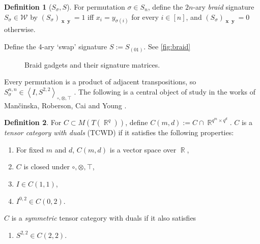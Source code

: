 \documentclass{article}
\theoremstyle{remark}
\theoremstyle{definition}
\newtheorem{definition}{Definition}[section]
\DeclareMathOperator{\rr}{\mathbb{R}}
\DeclareMathOperator{\vx}{\mathbf{x}}
\DeclareMathOperator{\vy}{\mathbf{y}}
\newcommand{\tcwdn}[1]{\left\langle #1 \right\rangle_{\circ, \otimes ,\top}}
\begin{document}
\begin{definition}[$S_\sigma, S$]
    For permutation $\sigma \in S_n$, define the $2n$-ary \emph{braid} signature $S_\sigma \in \mathcal{W}$ 
    by $(S_\sigma)_{\vx\vy} = 1$ iff $x_i = y_{\sigma(i)}$ for every $i \in [n]$, and 
    $(S_\sigma)_{\vx\vy} = 0$ otherwise.

    Define the 4-ary `swap' signature $S := S_{(01)}$. See \autoref{fig:braid}
\end{definition}
\begin{figure}[ht!]
    \centering
     \caption{Braid gadgets and their signature matrices.}
    \label{fig:braid}
\end{figure}
Every permutation is a product of adjacent transpositions, so
$S_\sigma^{n,n} \in \tcwdn{I,S^{2,2}}$ \cite[Lemma 3]{young2022equality}.
The following is a central object of study in the works of
Man\v{c}inska, Roberson, Cai and Young \cite{planar, cai_planar_2023, young2022equality}. 
\begin{definition}
\label{def:tcwd}
For $C \subset M(T(\rr^q))$, define $C(m,d) := C \cap \rr^{q^m\times q^d}$.
$C$ is a \emph{tensor category with duals} (TCWD) if it satisfies the following properties:
\begin{enumerate}[label=(\roman*)]
    \item For fixed $m$ and $d$, $C(m,d)$ is a vector space over $\rr$,
    \item $C$ is closed under $\circ, \otimes, \top$,
    \item $I \in C(1,1)$,
    \item $I^{0,2} \in C(0,2)$.
\end{enumerate}
$C$ is a \emph{symmetric} tensor category with duals if it also satisfies
\begin{enumerate}[label=(\roman*),start=5]
    \item $S^{2,2} \in C(2,2)$.
\end{enumerate}
\end{definition}
\end{document}
